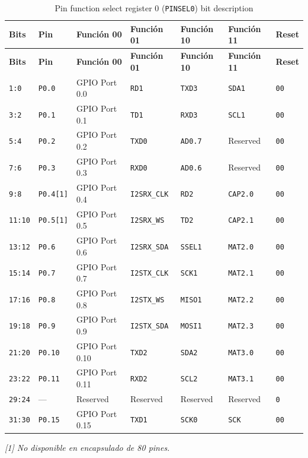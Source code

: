 \begin{longtable}{|>{\raggedright\arraybackslash}p{}|>{\raggedright\arraybackslash}p{}|>{\raggedright\arraybackslash}p{}|>{\raggedright\arraybackslash}p{}|>{\raggedright\arraybackslash}p{}|>{\raggedright\arraybackslash}p{}|>{\centering\arraybackslash}p{}|}
\caption{Pin function select register 0 (\texttt{PINSEL0}) bit description}\\
\hline
\textbf{Bits} & \textbf{Pin} & \textbf{Función 00} & \textbf{Función 01} & \textbf{Función 10} & \textbf{Función 11} & \textbf{Reset} \\
\hline
\endfirsthead
\hline
\textbf{Bits} & \textbf{Pin} & \textbf{Función 00} & \textbf{Función 01} & \textbf{Función 10} & \textbf{Función 11} & \textbf{Reset} \\
\hline
\endhead
\texttt{1:0} & \texttt{P0.0} & GPIO Port 0.0 & \texttt{RD1} & \texttt{TXD3} & \texttt{SDA1} & \texttt{00} \\
\hline
\texttt{3:2} & \texttt{P0.1} & GPIO Port 0.1 & \texttt{TD1} & \texttt{RXD3} & \texttt{SCL1} & \texttt{00} \\
\hline
\texttt{5:4} & \texttt{P0.2} & GPIO Port 0.2 & \texttt{TXD0} & \texttt{AD0.7} & Reserved & \texttt{00} \\
\hline
\texttt{7:6} & \texttt{P0.3} & GPIO Port 0.3 & \texttt{RXD0} & \texttt{AD0.6} & Reserved & \texttt{00} \\
\hline
\texttt{9:8} & \texttt{P0.4[1]} & GPIO Port 0.4 & \texttt{I2SRX\_CLK} & \texttt{RD2} & \texttt{CAP2.0} & \texttt{00} \\
\hline
\texttt{11:10} & \texttt{P0.5[1]} & GPIO Port 0.5 & \texttt{I2SRX\_WS} & \texttt{TD2} & \texttt{CAP2.1} & \texttt{00} \\
\hline
\texttt{13:12} & \texttt{P0.6} & GPIO Port 0.6 & \texttt{I2SRX\_SDA} & \texttt{SSEL1} & \texttt{MAT2.0} & \texttt{00} \\
\hline
\texttt{15:14} & \texttt{P0.7} & GPIO Port 0.7 & \texttt{I2STX\_CLK} & \texttt{SCK1} & \texttt{MAT2.1} & \texttt{00} \\
\hline
\texttt{17:16} & \texttt{P0.8} & GPIO Port 0.8 & \texttt{I2STX\_WS} & \texttt{MISO1} & \texttt{MAT2.2} & \texttt{00} \\
\hline
\texttt{19:18} & \texttt{P0.9} & GPIO Port 0.9 & \texttt{I2STX\_SDA} & \texttt{MOSI1} & \texttt{MAT2.3} & \texttt{00} \\
\hline
\texttt{21:20} & \texttt{P0.10} & GPIO Port 0.10 & \texttt{TXD2} & \texttt{SDA2} & \texttt{MAT3.0} & \texttt{00} \\
\hline
\texttt{23:22} & \texttt{P0.11} & GPIO Port 0.11 & \texttt{RXD2} & \texttt{SCL2} & \texttt{MAT3.1} & \texttt{00} \\
\hline
\texttt{29:24} & --- & Reserved & Reserved & Reserved & Reserved & \texttt{0} \\
\hline
\texttt{31:30} & \texttt{P0.15} & GPIO Port 0.15 & \texttt{TXD1} & \texttt{SCK0} & \texttt{SCK} & \texttt{00} \\
\hline
\end{longtable}
\noindent\textit{[1] No disponible en encapsulado de 80 pines.}

